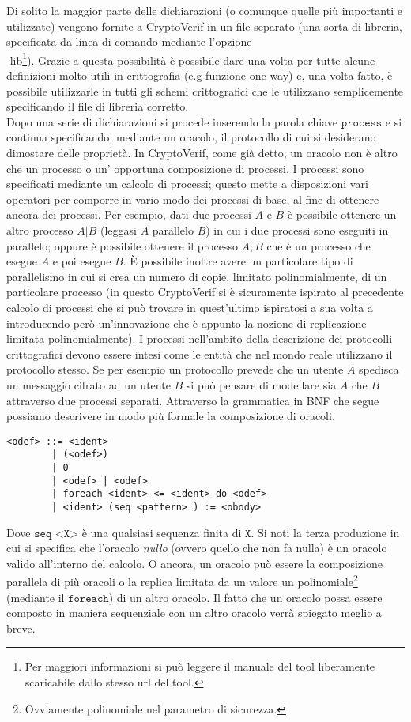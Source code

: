 \documentclass[a4paper,openright,twoside,12pt]{report}
\begin{document}
Di solito la maggior parte delle dichiarazioni (o comunque quelle pi\`u importanti e utilizzate) vengono fornite a CryptoVerif in un file separato (una sorta di libreria, specificata da linea di comando
mediante l'opzione \\-lib\footnote{Per maggiori informazioni si pu\`o leggere il manuale del tool liberamente scaricabile dallo stesso url del tool.}). 
Grazie a questa possibilit\`a \`e possibile dare una volta per tutte alcune definizioni molto utili in crittografia (e.g funzione one-way) e, 
una volta fatto, \`e possibile utilizzarle in tutti gli schemi crittografici che le utilizzano semplicemente specificando il file di libreria corretto.\\
Dopo una serie di dichiarazioni si procede inserendo la parola chiave $\texttt{process}$ e si continua specificando, mediante un oracolo, il protocollo di cui si desiderano dimostare delle propriet\`a. 
In CryptoVerif, come gi\`a detto, un oracolo non \`e altro che un processo o un' opportuna composizione di processi. 
I processi sono specificati mediante un calcolo di processi; questo mette a disposizioni vari operatori per comporre in vario modo dei processi di base, al fine di ottenere
ancora dei processi. Per esempio, dati due processi $A$ e $B$ \`e possibile ottenere un altro processo $A|B$ (leggasi $A$ parallelo $B$) in cui i due processi
sono eseguiti in parallelo; oppure \`e possibile ottenere il processo $A;B$ che \`e un processo che esegue $A$ e poi esegue $B$. \`E possibile inoltre avere
un particolare tipo di parallelismo in cui si crea un numero di copie, limitato polinomialmente, di un particolare processo (in questo CryptoVerif
si \`e sicuramente ispirato al precedente calcolo di processi che si pu\`o trovare in \cite{MitchellRST06} quest'ultimo ispiratosi a sua volta
a \cite{AbadiG99} introducendo per\`o un'innovazione che \`e appunto la nozione di replicazione limitata polinomialmente). I processi nell'ambito della descrizione dei protocolli crittografici
devono essere intesi come le entit\`a che nel mondo reale utilizzano il protocollo stesso. Se per esempio un protocollo prevede che un utente $A$ spedisca un messaggio cifrato ad un 
utente $B$ si pu\`o pensare di modellare sia $A$ che $B$ attraverso due processi separati. Attraverso la grammatica in BNF che segue possiamo descrivere in modo pi\`u formale 
la composizione di oracoli.\\
\begin{verbatim}
<odef> ::= <ident>
        | (<odef>)
        | 0
        | <odef> | <odef>
        | foreach <ident> <= <ident> do <odef>
        | <ident> (seq <pattern> ) := <obody>
\end{verbatim} 
Dove $\texttt{seq <X>}$ \`e una qualsiasi sequenza finita di $\texttt{X}$.
Si noti la terza produzione in cui si specifica che l'oracolo \emph{nullo} (ovvero quello che non fa nulla) \`e un oracolo valido all'interno del calcolo. O ancora, un oracolo pu\`o essere la composizione parallela di
pi\`u oracoli o la replica limitata da un valore un polinomiale\footnote{Ovviamente polinomiale nel parametro di sicurezza.} (mediante il $\texttt{foreach}$) di un altro oracolo. Il fatto che un oracolo possa essere composto in maniera sequenziale con un altro oracolo
verr\`a spiegato meglio a breve.
\end{document}
